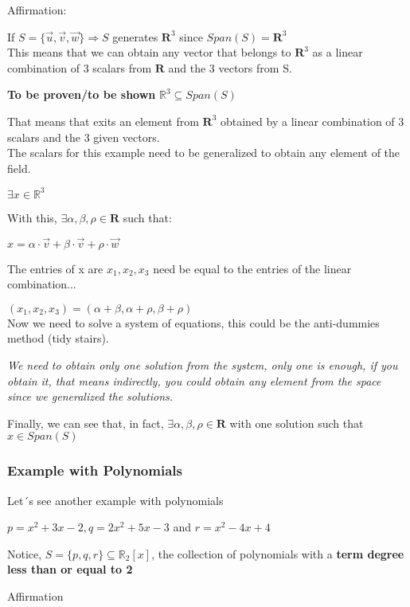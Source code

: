 \documentclass{article}
\begin{document}
Affirmation:

If \(S = \{\vec{u}, \vec{v}, \vec{w}\} \Rightarrow S\) generates \(\mathbf{R}^3\) since \(Span(S) = \mathbf{R}^3\)
\\
This means that we can obtain any vector that belongs to \(\mathbf{R}^3\) as a linear combination of 3 scalars from \(\mathbf{R}\) and the 3 vectors from S.

\textbf{To be proven/to be shown} \(\mathbb{R}^3 \subseteq Span(S)\)

That means that exits an element from \(\mathbf{R}^3\) obtained by a linear combination of 3 scalars and the 3 given vectors. 
\\

The scalars for this example need to be generalized to obtain any element of the field. 

\(\exists x \in \mathbb{R}^3\)

With this, \(\exists \alpha, \beta, \rho \in \mathbf{R}\) such that:

\(x = \alpha \cdot \vec{v} + \beta \cdot \vec{v} + \rho \cdot \vec{w}\) 

The entries of x are \(x_1, x_2, x_3\) need be equal to the entries of the linear combination...

\((x_1, x_2, x_3) = (\alpha + \beta, \alpha + \rho, \beta + \rho)\)
\\

Now we need to solve a system of equations, this could be the anti-dummies method (tidy stairs).

\textit{We need to obtain only one solution from the system, only one is enough, if you obtain it, that means indirectly, you could obtain any element from the space since we generalized the solutions.}

Finally, we can see that, in fact, \(\exists \alpha, \beta, \rho \in \mathbf{R}\) with one solution such that \(x \in Span(S)\)

\subsubsection*{Example with Polynomials}
Let´s see another example with polynomials

\(p = x^2 + 3x -2, q = 2x^2 + 5x -3\) and \(r=x^2 - 4x +4\)

Notice, \(S = \{ p,q,r\} \subseteq \mathbb{R}_2[x]\), the collection of polynomials with a \textbf{term degree less than or equal to 2}

Affirmation
\end{document}
